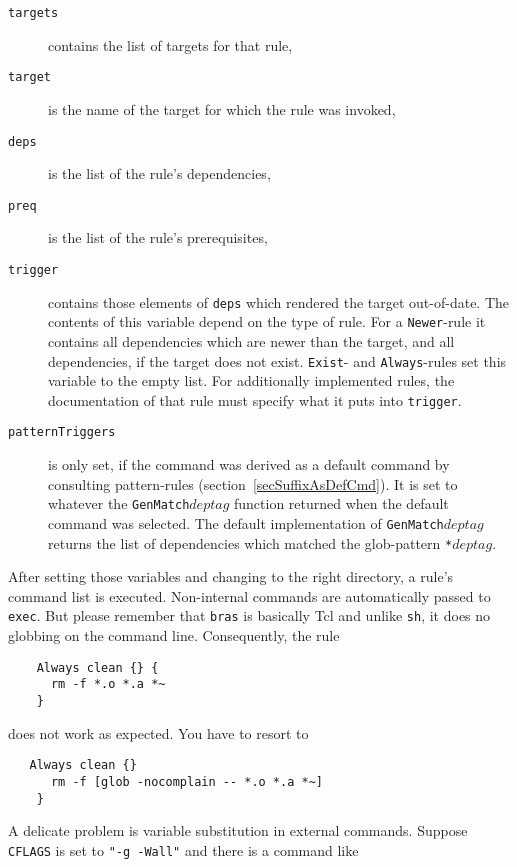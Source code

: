 \documentclass[12pt]{article}
\newcommand{\bras}{\texttt{bras}}
\begin{document}
\begin{description}
\item[\texttt{targets}] 
contains the list of targets for that rule,

\item[\texttt{target}] 
is the name of the target for which the rule
was invoked,

\item[\texttt{deps}] 
is the list of the rule's dependencies,

\item[\texttt{preq}] 
is the list of the rule's prerequisites,

\item[\texttt{trigger}]
contains those elements of \texttt{deps} which rendered the target
out-of-date. The contents of this variable depend on the type of
rule. For a \texttt{Newer}-rule it contains all dependencies which are
newer than the target, and all dependencies, if the target does not
exist. \texttt{Exist}- and \texttt{Always}-rules set this variable to
the empty list. For additionally implemented rules, the documentation
of that rule must specify what it puts into \texttt{trigger}.

\item[\texttt{patternTriggers}] is only set, if the command was
derived as a default command by consulting pattern-rules
(section~\ref{secSuffixAsDefCmd}). It is set to whatever the
\texttt{GenMatch$deptag$} function returned when the default command
was selected. The default implementation of \texttt{GenMatch$deptag$}
returns the list of dependencies which matched the glob-pattern
\texttt{*$deptag$}.
\end{description}

After setting those variables and changing to the right directory, a
rule's command list is executed. Non-internal commands are
automatically passed to \texttt{exec}. But please remember that
\bras{} is basically Tcl and unlike \texttt{sh}, it does no globbing
on the command line. Consequently, the rule
\begin{verbatim}
    Always clean {} {
      rm -f *.o *.a *~
    }
\end{verbatim}
does not work as expected. You have to resort to
\begin{verbatim}
   Always clean {}
      rm -f [glob -nocomplain -- *.o *.a *~]
    }
\end{verbatim}
    
A delicate problem is variable substitution in
external commands. Suppose \texttt{CFLAGS} is set to 
\texttt{"-g -Wall"} and there is a command like 
\end{document}
